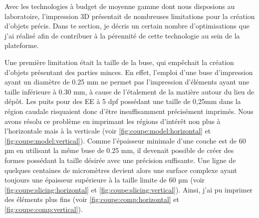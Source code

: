 \documentclass[\main/main.tex]{subfiles}
\begin{document}
%
Avec les technologies à budget de moyenne gamme dont nous disposions au laboratoire, l'impression 3D présentait de nombreuses limitations pour la création d'objets précis. Dans te section, je décris un certain nombre d'optimisations que j'ai réalisé afin de contribuer à la pérennité de cette technologie au sein de la plateforme.

%
Une première limitation était la taille de la buse, qui empêchait la création d'objets présentant des parties minces.
%
En effet, l'emploi d'une buse d'impression ayant un diamètre de 0.25 mm ne permet pas l'impression d'éléments ayant une taille inférieure à 0.30 mm, à cause de l'étalement de la matière autour du lieu de dépôt. Les puits pour des EE à 5 dpf possédant une taille de 0,25mm dans la région caudale risquaient donc d'être insuffisamment précisément imprimés.
%
Nous avons résolu ce problème en imprimant les régions d'intérêt non plus à l'horizontale mais à la verticale (voir \autoref{fig:coupe:model:horizontal} et \autoref{fig:coupe:model:vertical}). Comme l'épaisseur minimale d'une couche est de 60 µm en utilisant la même buse de 0.25 mm, il devenait possible de créer des formes possédant la taille désirée avec une précision suffisante.
%
Une ligne de quelques centaines de micromètres devient alors une surface complexe ayant toujours une épaisseur supérieure à la taille limite de 60 µm  (voir \autoref{fig:coupe:slicing:horizontal} et \autoref{fig:coupe:slicing:vertical}).
%
Ainsi, j'ai pu imprimer des éléments plus fins (voir \autoref{fig:coupe:comp:horizontal} et \autoref{fig:coupe:comp:vertical}).
\end{document}
